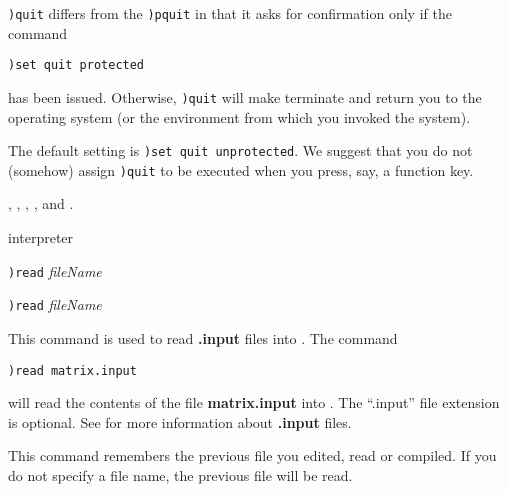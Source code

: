{{{{{{{{\tt )quit} differs from the {\tt )pquit} in that it asks for
confirmation only if the command
\begin{verbatim}
)set quit protected
\end{verbatim}
has been issued.
Otherwise, {\tt )quit} will make \Language{} terminate and return you
to the operating system (or the environment from which you invoked the
system).

The default setting is {\tt )set quit unprotected}.  We
suggest that you do not (somehow) assign {\tt )quit} to be
executed when you press, say, a function key.

\par{}
,
,
,
, and
.




\par{} interpreter

\par{}
\begin{simpleList}
\item {\tt )read} {\it \lanb{}fileName\ranb{}}
\item {\tt )read} {\it \lanb{}fileName\ranb{}} \ranb{} \ranb{}
\end{simpleList}
\par{}

This command is used to read {\bf .input} files into \Language{}.
The command
\begin{verbatim}
)read matrix.input
\end{verbatim}
will read the contents of the file {\bf matrix.input} into
\Language{}.
The ``.input'' file extension is optional.
See  for more information about {\bf .input} files.

This command remembers the previous file you edited, read or compiled.
If you do not specify a file name, the previous file will be read.

}}}}}}}
